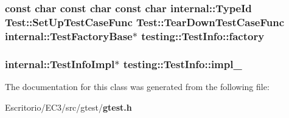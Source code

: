 \subsubsection{\setlength{\rightskip}{0pt plus 5cm}const char const char const char {\bf internal::TypeId} Test::SetUpTestCaseFunc Test::TearDownTestCaseFunc {\bf internal::TestFactoryBase}$\ast$ {\bf testing::TestInfo::factory}\hspace{0.3cm}{\tt  [package]}}\label{classtesting_1_1TestInfo_b02555c7691ca9d0fb0bcca5ca328d2d}


\subsubsection{\hspace{0.3cm}{\tt  [package]}}\label{classtesting_1_1TestInfo_786579989a4ac4253f63c41f71690098}


\subsubsection{\setlength{\rightskip}{0pt plus 5cm}internal::TestInfoImpl$\ast$ {\bf testing::TestInfo::impl\_\-}\hspace{0.3cm}{\tt  [package]}}\label{classtesting_1_1TestInfo_a7cba6a8092514424ef3929120ba4e11}




The documentation for this class was generated from the following file:\begin{CompactItemize}
\item 
Escritorio/EC3/src/gtest/{\bf gtest.h}\end{CompactItemize}
